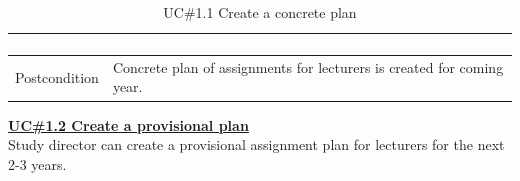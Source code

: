 \documentclass{scrartcl}
\begin{document}
\begin{table}[H]
\begin{center}
\begin{tabular}{| p{2.5cm}| p{12.5cm} |}
\begin{enumerate}
			\end{enumerate}
	             \\ \hline	        
	          Postcondition &   Concrete plan of assignments for lecturers is created for coming year. \\ \hline
	           
\end{tabular}
\end{center}
\caption{ UC\#1.1 Create a concrete plan}
\label{table2}
\end{table}
			
			
			 	 
			
			  

			

\textbf{\underline{UC\#1.2 Create a provisional plan }  }    \\ 
  Study director  can create a provisional assignment plan for lecturers for the next 2-3 years.      	\\
  
\end{document}
